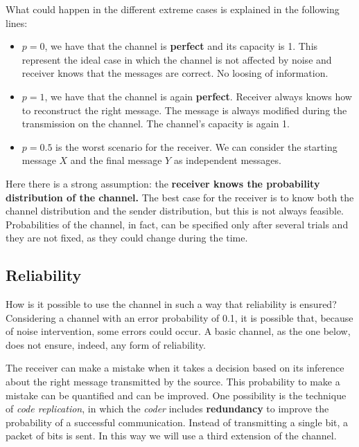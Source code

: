 What could happen in the different extreme cases is explained in the following lines:
\begin{itemize}
	\item $p = 0$, we have that the channel is \textbf{perfect} and its capacity is 1. This represent the ideal case in which the channel is not affected by noise and receiver knows that the messages are correct. No loosing of information.
	
	\item $p = 1$, we have that the channel is again \textbf{perfect}. Receiver always knows how to reconstruct the right message. The message is always modified during the transmission on the channel. The channel's capacity is again 1.
	
	\item $p=0.5$ is the worst scenario for the receiver. We can consider the starting message $X$ and the final message $Y$ as independent messages.
\end{itemize}
Here there is a strong assumption: the \textbf{receiver knows the probability distribution of the channel.}
The best case for the receiver is to know both the channel distribution and the sender distribution, but this is not always feasible.
Probabilities of the channel, in fact, can be specified only after several trials and they are not fixed, as they could change during the time.

\subsection{Reliability}
How is it possible to use the channel in such a way that reliability is ensured?\\
Considering a channel with an error probability of 0.1, it is possible that, because of noise intervention, some errors could occur. A basic channel, as the one below, does not ensure, indeed, any form of reliability.

The receiver can make a mistake when it takes a decision based on its inference about the right message transmitted by the source. This probability to make a mistake can be quantified and can be improved. One possibility is the technique of \textit{code replication}, in which the \textit{coder} includes \textbf{redundancy} to improve the probability of a successful communication. Instead of transmitting a single bit, a packet of bits is sent. In this way we will use a third extension of the channel.

